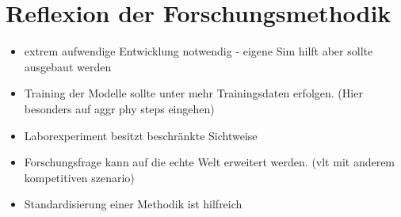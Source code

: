 \section{Reflexion der Forschungsmethodik}

\begin{itemize}
    \item extrem aufwendige Entwicklung notwendig - eigene Sim hilft aber sollte ausgebaut werden
    \item Training der Modelle sollte unter mehr Trainingsdaten erfolgen. (Hier besonders auf aggr phy steps eingehen)
    \item Laborexperiment besitzt beschränkte Sichtweise
    \item Forschungsfrage kann auf die echte Welt erweitert werden. (vlt mit anderem kompetitiven szenario)
    \item Standardisierung einer Methodik ist hilfreich
\end{itemize}